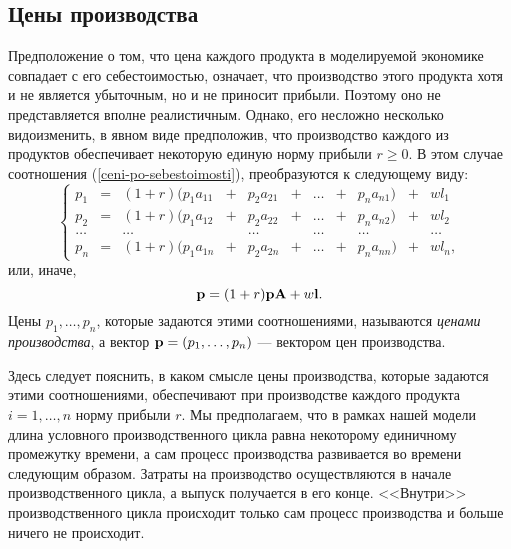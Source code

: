 \subsection{Цены производства}
    Предположение о том, что цена каждого продукта в моделируемой экономике совпадает с
    его себестоимостью, означает, что производство этого продукта
    хотя и не является убыточным, но и не приносит прибыли. Поэтому
    оно не представляется вполне реалистичным. Однако, его несложно
    несколько видоизменить, в явном виде предположив, что
    производство каждого из продуктов обеспечивает некоторую единую
    норму прибыли $r\geq0$. В этом случае соотношения (\ref{ceni-po-sebestoimosti}),
    преобразуются к следующему виду:
    \[\left\{
\begin{array}{ccccccccccc}
  p_{1} & = & (1+r)(p_{1}a_{11} & + & p_{2}a_{21} & + & \ldots & + & p_{n}a_{n1}) & + & wl_{1} \\
  p_{2} & = & (1+r)(p_{1}a_{12} & + & p_{2}a_{22} & + & \ldots & + & p_{n}a_{n2}) & + & wl_{2}\\
  \ldots &  & \ldots &  & \ldots &  & \ldots &  & \ldots  &  & \ldots\\
  p_{n} & = & (1+r)(p_{1}a_{1n} & + & p_{2}a_{2n} & + & \ldots & + & p_{n}a_{nn}) & + &  wl_{n},
\end{array}
\right.\]
    или, иначе,
    \[\mathbf{p}=(1+r)\mathbf{p}\mathbf{A}+w\mathbf{l}.\]
    Цены $p_{1},\ldots,p_{n}$, которые задаются этими соотношениями,
    называются \emph{ценами производства}, а вектор
    $\mathbf{p}=(p_{1},\ldots,p_{n})$ --- вектором цен производства.

    Здесь следует пояснить, в каком смысле цены производства, которые задаются этими
    соотношениями, обеспечивают при производстве каждого продукта
    $i=1,\ldots,n$ норму прибыли $r$. Мы предполагаем, что в рамках нашей модели
    длина условного производственного цикла равна некоторому единичному промежутку
    времени, а сам процесс
    производства  развивается во времени следующим
    образом. Затраты на производство осуществляются в начале
    производственного цикла, а выпуск получается в его
    конце. <<Внутри>> производственного цикла происходит только сам процесс
    производства и больше ничего не происходит.


